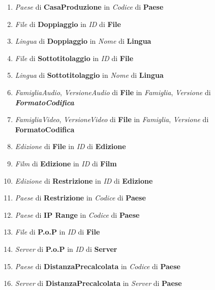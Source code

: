 \documentclass{article}
\begin{document}
\begin{enumerate}
    \item \textit{Paese} di \textbf{CasaProduzione} in \textit{Codice} di \textbf{Paese}
    
    \item \textit{File} di \textbf{Doppiaggio} in \textit{ID} di \textbf{File}
    
    \item \textit{Lingua} di \textbf{Doppiaggio} in \textit{Nome} di \textbf{Lingua}
    
    \item \textit{File} di \textbf{Sottotitolaggio} in \textit{ID} di \textbf{File}
    
    \item \textit{Lingua} di \textbf{Sottotitolaggio} in \textit{Nome} di \textbf{Lingua}
    
    \item \textit{FamigliaAudio}, \textit{VersioneAudio} di \textbf{File} in \textit{Famiglia}, \textit{Versione} di 
    \textbf{\textit{FormatoCodifica}}
    
    \item \textit{FamigliaVideo}, \textit{VersioneVideo} di \textbf{File} in \textit{Famiglia}, \textit{Versione} di \textbf{FormatoCodifica}
    \item \textit{Edizione} di \textbf{File} in \textit{ID} di \textbf{Edizione}
    
    \item \textit{Film} di \textbf{Edizione} in \textit{ID} di \textbf{Film}
    
    \item \textit{Edizione} di \textbf{Restrizione} in \textit{ID} di \textbf{Edizione}
    
    \item \textit{Paese} di \textbf{Restrizione} in \textit{Codice} di \textbf{Paese}
    
    \item \textit{Paese} di \textbf{IP Range} in \textit{Codice} di \textbf{Paese}
    
    \item \textit{File} di \textbf{P.o.P} in \textit{ID} di \textbf{File}
    \item \textit{Server} di \textbf{P.o.P} in \textit{ID} di \textbf{Server}
    
    \item \textit{Paese} di \textbf{DistanzaPrecalcolata} in \textit{Codice} di \textbf{Paese}
    
    \item \textit{Server} di \textbf{DistanzaPrecalcolata} in \textit{Server} di \textbf{Paese}
    

\end{enumerate}
\end{document}
